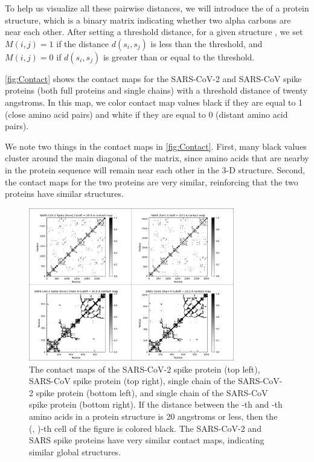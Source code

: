 To help us visualize all these pairwise distances, we will introduce the  of a protein structure, which is a binary matrix indicating whether two alpha carbons are near each other. After setting a threshold distance, for a given structure , we set $M(i, j) = 1$ if the distance $d(s_{i}, s_{j})$ is less than the threshold, and $M(i, j) = 0$ if $d(s_{i}, s_{j})$ is greater than or equal to the threshold.

\autoref{fig:Contact} shows the contact maps for the SARS-CoV-2 and SARS-CoV spike proteins (both full proteins and single chains) with a threshold distance of twenty angstroms. In this map, we color contact map values black if they are equal to 1 (close amino acid pairs) and white if they are equal to 0 (distant amino acid pairs).

We note two things in the contact maps in \autoref{fig:Contact}. First, many black values cluster around the main diagonal of the matrix, since amino acids that are nearby in the protein sequence will remain near each other in the 3-D structure. Second, the contact maps for the two proteins are very similar, reinforcing that the two proteins have similar structures.\\

\begin{figure}[h]
	\centering
	\mySfFamily
	\includegraphics[width = 0.8\textwidth]{../images/Contact.png}
	\caption{The contact maps of the SARS-CoV-2 spike protein (top left), SARS-CoV spike protein (top right), single chain of the SARS-CoV-2 spike protein (bottom left), and single chain of the SARS-CoV spike protein (bottom right). If the distance between the -th and -th amino acids in a protein structure is 20 angstroms or less, then the (, )-th cell of the figure is colored black. The SARS-CoV-2 and SARS spike proteins have very similar contact maps, indicating similar global structures.}
	\label{fig:Contact}
\end{figure}

